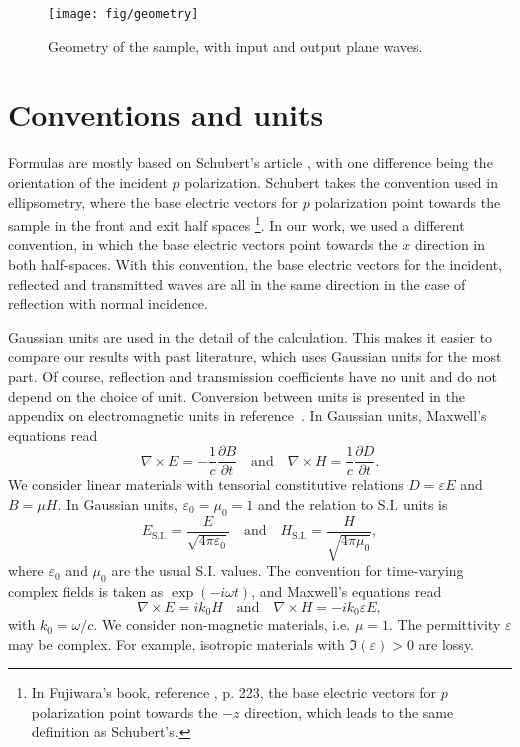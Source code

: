 \begin{figure}
\texttt{[image: fig/geometry]}
\caption{\label{fig:geometry}Geometry of the sample, with input and output plane waves. }
\end{figure}

\section{Conventions and units}

Formulas are mostly based on Schubert's article \cite{Schubert}, with one difference being the orientation of the incident $p$ polarization.
Schubert takes the convention used in ellipsometry, where the base electric vectors for $p$ polarization point towards the sample in the front and exit half spaces%
\footnote{In Fujiwara's book, reference , p. 223, the base electric vectors for $p$ polarization point towards the $-z$ direction, which leads to the same definition as Schubert's.}.
In our work, we used a different convention, in which the base electric vectors point towards the $x$ direction in both half-spaces.
With this convention, the base electric vectors for the incident, reflected and transmitted waves are all in the same direction in the case of reflection with normal incidence.

Gaussian units are used in the detail of the calculation.
This makes it easier to compare our results with past literature, which uses Gaussian units for the most part.
Of course, reflection and transmission coefficients have no unit and do not depend on the choice of unit.
Conversion between units is presented in the appendix on electromagnetic units in reference~.
In Gaussian units, Maxwell's equations read
$$
\nabla\times E = -\frac{1}{c} \frac{\partial B}{\partial t} 
\quad \mathrm{and} \quad
\nabla\times H = \frac{1}{c} \frac{\partial D}{\partial t}.
$$
We consider linear materials with tensorial constitutive relations
$D = \varepsilon E$ and $B = \mu H$.
In Gaussian units, $\varepsilon_0=\mu_0=1$ and the relation to S.I. units is
$$
E_\mathrm{S.I.} = \frac{E}{\sqrt{4\pi\varepsilon_0}}
\quad \mathrm{and} \quad
H_\mathrm{S.I.} = \frac{H}{\sqrt{4\pi\mu_0}},
$$
where $\varepsilon_0$ and $\mu_0$ are the usual S.I. values.
%
The convention for time-varying complex fields is taken as $\exp(-i\omega t)$, and Maxwell's equations read
$$
\nabla\times E = i k_0 H
\quad \mathrm{and} \quad
\nabla\times H = -i k_0 \varepsilon E,
$$
with $k_0=\omega/c$.
We consider non-magnetic materials, i.e. $\mu = 1$.
The permittivity $\varepsilon$ may be complex. 
For example, isotropic materials with $\Im(\varepsilon)>0$ are lossy.


